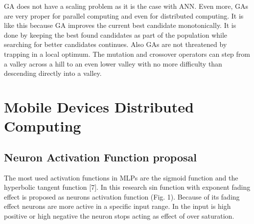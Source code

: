 \documentclass{llncs}
\begin{document}
GA does not have a scaling problem as it is the case with ANN. Even more, GAs are very proper for parallel computing and even for distributed computing. It is like this because GA improves the current best candidate monotonically. It is done by keeping the best found candidates as part of the population while searching for better candidates continues. Also GAs are not threatened by trapping in a local optimum. The mutation and crossover operators can step from a valley across a hill to an even lower valley with no more difficulty than descending directly into a valley.
%
\section{Mobile Devices Distributed Computing}
%
%
\subsection{Neuron Activation Function proposal}
%
The most used activation functions in MLPs are the sigmoid function and the hyperbolic tangent function [7]. In this research sin function with exponent fading effect is proposed as neurons activation function (Fig. 1). Because of its fading effect neurons are more active in a specific input range. In the input is high positive or high negative the neuron stops acting as effect of over saturation.
\end{document}
